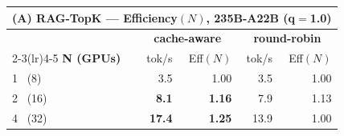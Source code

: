 \begin{table}[t]
  \centering
  \small
  \begin{tabular}{@{}l r r r r@{}}
    \multicolumn{5}{c}{\textbf{(A) RAG-TopK} --- Efficiency$(N)$, 235B-A22B (q$=$1.0)} \\
    \toprule
    & \multicolumn{2}{c}{\textbf{cache-aware}} & \multicolumn{2}{c}{\textbf{round-robin}} \\
    \cmidrule(lr){2-3}\cmidrule(lr){4-5}
    \textbf{N (GPUs)} & tok/s & Eff$(N)$ & tok/s & Eff$(N)$ \\
    \midrule
    1 \ (8)   & 3.5  & 1.00 & 3.5  & 1.00 \\
    2 \ (16)  & \textbf{8.1} & \textbf{1.16} & 7.9 & 1.13 \\
    4 \ (32)  & \textbf{17.4} & \textbf{1.25} & 13.9 & 1.00 \\
    \bottomrule
  \end{tabular}


\end{table}
